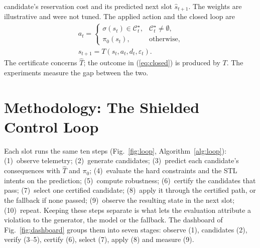 \documentclass[conference]{IEEEtran}
\newcommand{\That}{\hat{T}}
\newcommand{\shat}{\hat{s}}
\newcommand{\Ccal}{\mathcal{C}}
\begin{document}
candidate's reservation cost and its predicted next slot $\shat_{t+1}$. The weights are illustrative and were not tuned. The applied action and the closed loop are
\begin{equation}
\begin{gathered}
a_t = \begin{cases} \sigma(s_t)\in\Ccal^\star_t, & \Ccal^\star_t \neq \emptyset,\\
\pi_0(s_t), & \text{otherwise}, \end{cases}\\
s_{t+1} = T(s_t, a_t, d_t, \varepsilon_t).
\end{gathered}
\label{eq:closed}
\end{equation}
The certificate concerns $\That$; the outcome in (\ref{eq:closed}) is produced by
$T$. The experiments measure the gap between the two.

\section{Methodology: The Shielded Control Loop}
\label{sec:method}

Each slot runs the same ten steps (Fig.~\ref{fig:loop}, Algorithm~\ref{alg:loop}):
(1)~observe telemetry; (2)~generate candidates; (3)~predict each candidate's
consequences with $\That$ and $\pi_0$; (4)~evaluate the hard constraints and the
STL intents on the prediction; (5)~compute robustness; (6)~certify the candidates
that pass; (7)~select one certified candidate; (8)~apply it through the certified
path, or the fallback if none passed; (9)~observe the resulting state in the next
slot; (10)~repeat. Keeping these steps separate is what lets the evaluation
attribute a violation to the generator, the model or the fallback. The dashboard of
Fig.~\ref{fig:dashboard} groups them into seven stages: observe (1), candidates (2),
verify (3--5), certify (6), select (7), apply (8) and measure (9).
\end{document}

